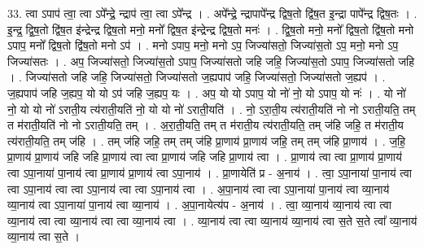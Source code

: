\documentclass[17pt]{extarticle}
\begin{document}
33. त्वा ऽपाप॑ त्वा॒ त्वा ऽपे᳚न्द्रे॒ न्द्राप॑ त्वा॒ त्वा ऽपे᳚न्द्र । . अपे᳚न्द्रे॒ न्द्रापापे᳚न्द्र द्विष॒तो द्वि॑ष॒त इ॒न्द्रा पापे᳚न्द्र द्विष॒तः । . इ॒न्द्र॒ द्वि॒ष॒तो द्वि॑ष॒त इ॑न्द्रेन्द्र द्विष॒तो मनो॒ मनो᳚ द्विष॒त इ॑न्द्रेन्द्र द्विष॒तो मनः॑ । . द्वि॒ष॒तो मनो॒ मनो᳚ द्विष॒तो द्वि॑ष॒तो मनो ऽपाप॒ मनो᳚ द्विष॒तो द्वि॑ष॒तो मनो ऽप॑ । . मनो ऽपाप॒ मनो॒ मनो ऽप॒ जिज्या॑सतो॒ जिज्या॑स॒तो ऽप॒ मनो॒ मनो ऽप॒ जिज्या॑सतः । . अप॒ जिज्या॑सतो॒ जिज्या॑स॒तो ऽपाप॒ जिज्या॑सतो जहि जहि॒ जिज्या॑स॒तो ऽपाप॒ जिज्या॑सतो जहि । . जिज्या॑सतो जहि जहि॒ जिज्या॑सतो॒ जिज्या॑सतो ज॒ह्यपाप॑ जहि॒ जिज्या॑सतो॒ जिज्या॑सतो ज॒ह्यप॑ । . ज॒ह्यपाप॑ जहि ज॒ह्यप॒ यो यो ऽप॑ जहि ज॒ह्यप॒ यः । . अप॒ यो यो ऽपाप॒ यो नो॑ नो॒ यो ऽपाप॒ यो नः॑ । . यो नो॑ नो॒ यो यो नो॑ ऽराती॒य त्य॑राती॒यति॑ नो॒ यो यो नो॑ ऽराती॒यति॑ । . नो॒ ऽरा॒ती॒य त्य॑राती॒यति॑ नो नो ऽराती॒यति॒ तम् त म॑राती॒यति॑ नो नो ऽराती॒यति॒ तम् । . अ॒रा॒ती॒यति॒ तम् त म॑राती॒य त्य॑राती॒यति॒ तम् ज॑हि जहि॒ त म॑राती॒य त्य॑राती॒यति॒ तम् ज॑हि । . तम् ज॑हि जहि॒ तम् तम् ज॑हि प्रा॒णाय॑ प्रा॒णाय॑ जहि॒ तम् तम् ज॑हि प्रा॒णाय॑ । . ज॒हि॒ प्रा॒णाय॑ प्रा॒णाय॑ जहि जहि प्रा॒णाय॑ त्वा त्वा प्रा॒णाय॑ जहि जहि प्रा॒णाय॑ त्वा । . प्रा॒णाय॑ त्वा त्वा प्रा॒णाय॑ प्रा॒णाय॑ त्वा ऽपा॒नाया॑ पा॒नाय॑ त्वा प्रा॒णाय॑ प्रा॒णाय॑ त्वा ऽपा॒नाय॑ । . प्रा॒णायेति॑ प्र - अ॒नाय॑ । . त्वा॒ ऽपा॒नाया॑ पा॒नाय॑ त्वा त्वा ऽपा॒नाय॑ त्वा त्वा ऽपा॒नाय॑ त्वा त्वा ऽपा॒नाय॑ त्वा । . अ॒पा॒नाय॑ त्वा त्वा ऽपा॒नाया॑ पा॒नाय॑ त्वा व्या॒नाय॑ व्या॒नाय॑ त्वा ऽपा॒नाया॑ पा॒नाय॑ त्वा व्या॒नाय॑ । . अ॒पा॒नायेत्य॑प - अ॒नाय॑ । . त्वा॒ व्या॒नाय॑ व्या॒नाय॑ त्वा त्वा व्या॒नाय॑ त्वा त्वा व्या॒नाय॑ त्वा त्वा व्या॒नाय॑ त्वा । . व्या॒नाय॑ त्वा त्वा व्या॒नाय॑ व्या॒नाय॑ त्वा स॒ते स॒ते त्वा᳚ व्या॒नाय॑ व्या॒नाय॑ त्वा स॒ते । \newline
\end{document}
